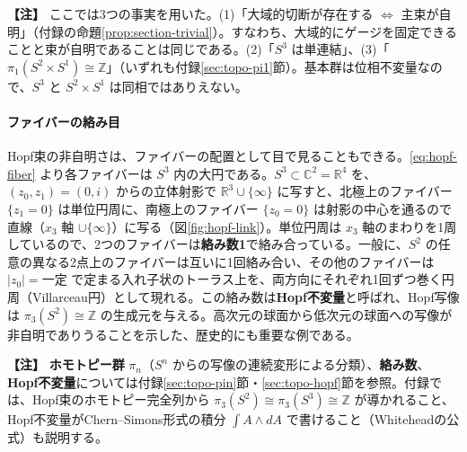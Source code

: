 \documentclass[uplatex, dvipdfmx, book]{jsbook}
\newenvironment{note}{\vspace{1ex}\par\footnotesize\noindent\textbf{【注】}}{\par\vspace{1ex}}
\begin{document}
\begin{note}
ここでは3つの事実を用いた。(1)「大域的切断が存在する $\iff$ 主束が自明」（付録の命題\ref{prop:section-trivial}）。すなわち、大域的にゲージを固定できることと束が自明であることは同じである。(2)「$S^3$ は単連結」、(3)「$\pi_1(S^2 \times S^1) \cong \mathbb{Z}$」（いずれも付録\ref{sec:topo-pi1}節）。基本群は位相不変量なので、$S^3$ と $S^2 \times S^1$ は同相ではありえない。
\end{note}

\paragraph{ファイバーの絡み目}
Hopf束の非自明さは、ファイバーの配置として目で見ることもできる。\eqref{eq:hopf-fiber} より各ファイバーは $S^3$ 内の大円である。$S^3 \subset \mathbb{C}^2 = \mathbb{R}^4$ を、$(z_0, z_1) = (0, i)$ からの立体射影で $\mathbb{R}^3 \cup \{\infty\}$ に写すと、北極上のファイバー $\{z_1 = 0\}$ は単位円周に、南極上のファイバー $\{z_0 = 0\}$ は射影の中心を通るので直線（$x_3$ 軸 $\cup \{\infty\}$）に写る（図\ref{fig:hopf-link}）。単位円周は $x_3$ 軸のまわりを1周しているので、2つのファイバーは\textbf{絡み数1}で絡み合っている。一般に、$S^2$ の任意の異なる2点上のファイバーは互いに1回絡み合い、その他のファイバーは $|z_0| = \text{一定}$ で定まる入れ子状のトーラス上を、両方向にそれぞれ1回ずつ巻く円周（Villarceau円）として現れる。この絡み数は\textbf{Hopf不変量}と呼ばれ、Hopf写像は $\pi_3(S^2) \cong \mathbb{Z}$ の生成元を与える。高次元の球面から低次元の球面への写像が非自明でありうることを示した、歴史的にも重要な例である。

\begin{note}
\textbf{ホモトピー群} $\pi_n$（$S^n$ からの写像の連続変形による分類）、\textbf{絡み数}、\textbf{Hopf不変量}については付録\ref{sec:topo-pin}節・\ref{sec:topo-hopf}節を参照。付録では、Hopf束のホモトピー完全列から $\pi_3(S^2) \cong \pi_3(S^3) \cong \mathbb{Z}$ が導かれること、Hopf不変量がChern--Simons形式の積分 $\int A \wedge dA$ で書けること（Whiteheadの公式）も説明する。
\end{note}
\end{document}
